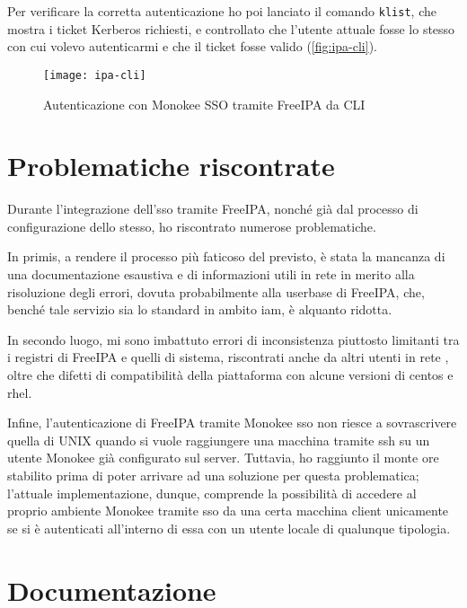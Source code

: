 Per verificare la corretta autenticazione ho poi lanciato il comando \texttt{klist}, che mostra i ticket Kerberos richiesti, e controllato che l'utente attuale fosse lo stesso con cui volevo autenticarmi e che il ticket fosse valido (\autoref{fig:ipa-cli}).  

\begin{figure}[H] 
    \centering 
    \texttt{[image: ipa-cli]} 
    \caption{Autenticazione con Monokee SSO tramite FreeIPA da CLI}
    \label{fig:ipa-cli}
\end{figure}


\section{Problematiche riscontrate}

Durante l'integrazione dell'\acrshort{sso} tramite FreeIPA, nonché già dal processo di configurazione dello stesso, ho riscontrato numerose problematiche.

In primis, a rendere il processo più faticoso del previsto, è stata la mancanza di una  documentazione esaustiva e di informazioni utili in rete in merito alla risoluzione degli errori, dovuta probabilmente alla userbase di FreeIPA, che, benché tale servizio sia lo standard in ambito \acrshort{iam}, è alquanto ridotta.

In secondo luogo, mi sono imbattuto errori di inconsistenza piuttosto limitanti tra i registri di FreeIPA e quelli di sistema, riscontrati anche da altri utenti in rete\cite{site:redhat-bugzilla} \cite{site:freeipa-issue} \cite{site:freeipa-users-1} \cite{site:freeipa-users-2} \cite{site:freeipa-users-3} \cite{site:centos-forums}, oltre che difetti di compatibilità della piattaforma con alcune versioni di \acrshort{centos} e \acrshort{rhel}.

Infine, l'autenticazione di FreeIPA tramite Monokee \acrshort{sso} non riesce a sovrascrivere quella di UNIX quando si vuole raggiungere una macchina tramite \acrshort{ssh} su un utente Monokee già configurato sul server. Tuttavia, ho raggiunto il monte ore stabilito prima di poter arrivare ad una soluzione per questa problematica; l'attuale implementazione, dunque, comprende la possibilità di accedere al proprio ambiente Monokee tramite \acrshort{sso} da una certa macchina client unicamente se si è autenticati all'interno di essa con un utente locale di qualunque tipologia.

\section{Documentazione}

